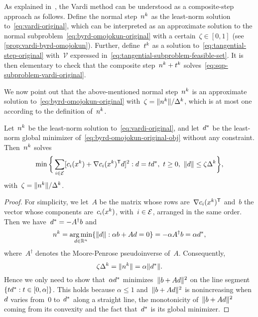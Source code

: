As explained in~\cite[\S~15.4.1]{Conn_Gould_Toint_2000}, the Vardi method can be understood as a composite-step approach as follows.
Define the normal step~$\nstep[k]$ as the least-norm solution to~\cref{eq:vardi-original}, which can be interpreted as an approximate solution to the normal subproblem~\cref{eq:byrd-omojokun-original} with a certain~$\zeta \in [0, 1]$ (see \cref{prop:vardi-byrd-omojokun}).
Further, define~$\tstep[k]$ as a solution to~\cref{eq:tangential-step-original} with~$\mathcal{V}$ expressed in~\cref{eq:tangential-subproblem-feasible-set}.
It is then elementary to check that the composite step~$\nstep[k] + \tstep[k]$ solves~\cref{eq:sqp-subproblem-vardi-original}.

We now point out that the above-mentioned normal step~$\nstep[k]$ is an approximate solution to~\cref{eq:byrd-omojokun-original} with~$\zeta = \norm{\nstep[k]} / \rad[k]$, which is at most one according to the definition of~$\nstep[k]$.

\begin{proposition}
    \label{prop:vardi-byrd-omojokun}
    Let~$\nstep[k]$ be the least-norm solution to~\cref{eq:vardi-original}, and let~$\step[\ast]$ be the least-norm global minimizer of~\cref{eq:byrd-omojokun-original-obj} without any constraint.
    Then~$\nstep[k]$ solves
    \begin{equation*}
        \min \set[\bigg]{\sum_{i \in \ieq} [\con{i}(\iter[k]) + \nabla \con{i}(\iter[k])^{\T} \step]^2 : \step = t \step[\ast], ~ t \ge 0, ~ \norm{d} \le \zeta \rad[k]},
    \end{equation*}
    with~$\zeta = \norm{\nstep[k]} / \rad[k]$.
\end{proposition}

\begin{proof}
    For simplicity, we let~$A$ be the matrix whose rows are~$\nabla \con{i}(\iter[k])^{\T}$ and~$b$ the vector whose components are~$\con{i}(\iter[k])$, with~$i \in \mathcal{E}$, arranged in the same order.
    Then we have~$\step[\ast] = -A^{\dagger} b$ and
    \begin{equation*}
        \nstep[k] = \argmin_{\step \in \R^n} \set{\norm{\step} : \alpha b + A \step = 0} = -\alpha A^{\dagger} b = \alpha \step[\ast],
    \end{equation*}
    where~$A^{\dagger}$ denotes the Moore-Penrose pseudoinverse of~$A$.
    Consequently,
    \begin{equation*}
        \zeta \rad[k] = \norm{\nstep[k]} = \alpha \norm{\step[\ast]}.
    \end{equation*}
    Hence we only need to show that~$\alpha \step[\ast]$ minimizes~$\norm{b + A \step}^2$ on the line segment~$\set{t \step[\ast] : t \in [0, \alpha]}$.
    This holds because $\alpha \le 1$ and~$\norm{b + A \step}^2$ is nonincreasing when $\step$ varies from~$0$ to~$\step[\ast]$ along a straight line, the monotonicity of~$\norm{b + A \step}^2$ coming from its convexity and the fact that~$\step[\ast]$ is its global minimizer.
\end{proof}

